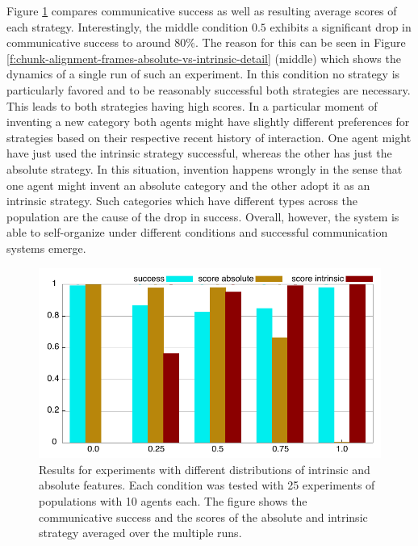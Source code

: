 Figure \ref{f:chunk-alignment-frames-absolute-vs-intrinsic-bar-plot} compares communicative success
as well as resulting average scores of each strategy. Interestingly, the middle condition $0.5$ exhibits
a significant drop in communicative success to around $80\%$. The reason for this can be seen in Figure 
\ref{f:chunk-alignment-frames-absolute-vs-intrinsic-detail} (middle) which shows the dynamics
of a single run of such an experiment. In this condition no strategy is particularly favored and to
be reasonably successful both strategies are necessary. This leads to both strategies having
high scores. In a particular moment of inventing a new category both agents might have slightly
different preferences for strategies based on their respective recent history of interaction.
One agent might have just used the intrinsic strategy successful, whereas the other has
just the absolute strategy. In this situation, invention happens wrongly in the sense that one
agent might invent an absolute category and the other adopt it as an intrinsic strategy.
Such categories which have different types across the population are the cause of the drop
in success. Overall, however, the system is able to self-organize under different conditions and successful
communication systems emerge.

\begin{figure}
\begin{center}
\includegraphics[width=1.0\columnwidth]{figs/chunk-alignment-frames-absolute-vs-intrinsic-bar-plot}
\end{center}
\caption[Comparison for different distributions of intrinsic and absolute features]{
Results for experiments with different distributions of intrinsic and absolute features. Each condition
was tested with 25 experiments of populations with 10 agents each. The figure shows the 
communicative success and the scores of the absolute and intrinsic strategy averaged over the
multiple runs.}
\label{f:chunk-alignment-frames-absolute-vs-intrinsic-bar-plot}
\end{figure}


